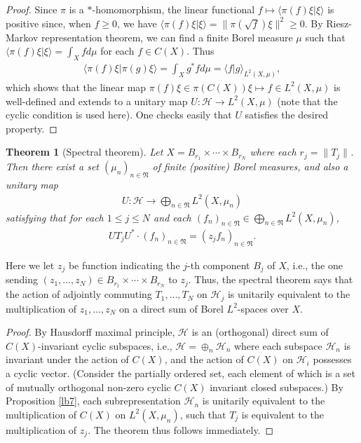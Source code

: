 \documentclass[12pt,a4paper,notitlepage]{article}
\theoremstyle{definition}
\theoremstyle{plain}
\newtheorem{thm}[df]{Theorem}
\newcommand{\fk}{\mathfrak}
\newcommand{\mc}{\mathcal}
\newcommand{\bk}[1]{\langle {#1}\rangle}
\numberwithin{equation}{section}
\begin{document}
\begin{proof}
Since $\pi$ is a $*$-homomorphism, the linear functional $f\mapsto \bk{\pi(f)\xi|\xi}$ is positive since, when $f\geq 0$, we have $\bk{\pi(f)\xi|\xi}=\lVert \pi(\sqrt f)\xi\lVert^2\geq 0$. By Riesz-Markov representation theorem, we can find a finite Borel measure $\mu$ such that $\bk{\pi(f)\xi|\xi}=\int_Xfd\mu$ for each $f\in C(X)$. Thus
\begin{align*}
\bk{\pi(f)\xi|\pi(g)\xi}=\int_Xg^*fd\mu=\bk{f|g}_{L^2(X,\mu)},
\end{align*}
which shows that the linear map $\pi(f)\xi\in\pi(C(X))\xi\mapsto f\in L^2(X,\mu)$ is well-defined and extends to a unitary map $U:\mc H\rightarrow L^2(X,\mu)$ (note that the cyclic condition is used here). One checks easily that $U$ satisfies the desired property.
\end{proof}


\begin{thm}[Spectral theorem]\label{lb8}
Let $X=B_{r_1}\times\cdots\times B_{r_N}$ where each $r_j=\lVert T_j\lVert$. Then there exist a set $(\mu_n)_{n\in\fk N}$ of finite (positive) Borel measures, and also a unitary map
\begin{align*}
U:\mc H\rightarrow\bigoplus_{n\in\fk N} L^2(X,\mu_n)
\end{align*}
satisfying that for each $1\leq j\leq N$ and each $(f_n)_{n\in\fk N}\in \bigoplus_{n\in\fk N} L^2(X,\mu_n)$,
\begin{align}
UT_jU^*\cdot (f_n)_{n\in\fk N}=(z_jf_n)_{n\in\fk N}.\label{eq10}
\end{align}
\end{thm}
Here we let $z_j$ be function indicating the $j$-th component $B_j$ of $X$, i.e., the one sending $(z_1,\dots,z_N)\in B_{r_1}\times\cdots\times B_{r_N}$ to $z_j$. Thus, the spectral theorem says that the action of adjointly commuting $T_1,\dots,T_N$ on $\mc H_j$ is unitarily equivalent to the multiplication of $z_1,\dots,z_N$ on a direct sum of Borel $L^2$-spaces over $X$.

\begin{proof}
By Hausdorff maximal principle, $\mc H$ is an (orthogonal) direct sum of $C(X)$-invariant cyclic subspaces, i.e., $\mc H=\oplus_n\mc H_n$ where each subspace $\mc H_n$ is invariant under the action of $C(X)$, and the action of $C(X)$ on $\mc H_i$ possesses a cyclic vector. (Consider the partially ordered set, each element of which is a set of mutually orthogonal non-zero cyclic $C(X)$ invariant closed subspaces.)  By Proposition \ref{lb7}, each subrepresentation $\mc H_n$ is unitarily equivalent  to the multiplication of $C(X)$ on $L^2(X,\mu_n)$, such that $T_j$ is equivalent to the multiplication of $z_j$. The theorem thus follows immediately.
\end{proof}
\end{document}
